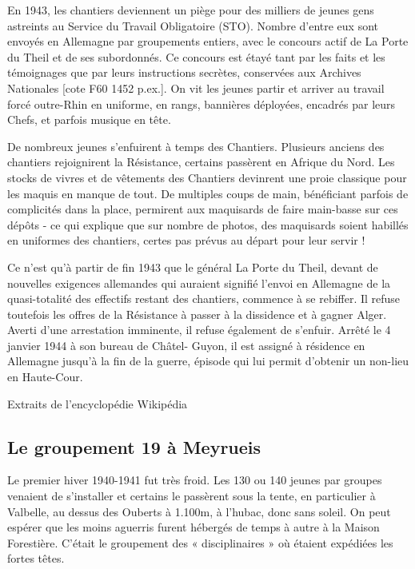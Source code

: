En 1943, les chantiers deviennent un piège pour des milliers de jeunes gens astreints au Service du Travail
Obligatoire (STO). Nombre d'entre eux sont envoyés en Allemagne par groupements entiers, avec le concours
actif de La Porte du Theil et de ses subordonnés. Ce concours est étayé tant par les faits et les témoignages
que par leurs instructions secrètes, conservées aux Archives Nationales [cote F60 1452 p.ex.]. On vit les
jeunes partir et arriver au travail forcé outre-Rhin en uniforme, en rangs, bannières déployées, encadrés par
leurs Chefs, et parfois musique en tête.

De nombreux jeunes s'enfuirent à temps des Chantiers. Plusieurs anciens des chantiers rejoignirent la
Résistance, certains passèrent en Afrique du Nord. Les stocks de vivres et de vêtements des Chantiers
devinrent une proie classique pour les maquis en manque de tout. De multiples coups de main, bénéficiant
parfois de complicités dans la place, permirent aux maquisards de faire main-basse sur ces dépôts - ce qui
explique que sur nombre de photos, des maquisards soient habillés en uniformes des chantiers, certes pas
prévus au départ pour leur servir !

Ce n'est qu'à partir de fin 1943 que le général La Porte du Theil, devant de nouvelles exigences allemandes
qui auraient signifié l'envoi en Allemagne de la quasi-totalité des effectifs restant des chantiers, commence
à se rebiffer. Il refuse toutefois les offres de la Résistance à passer à la dissidence et à gagner Alger. Averti
d'une arrestation imminente, il refuse également de s'enfuir. Arrêté le 4 janvier 1944 à son bureau de Châtel-
Guyon, il est assigné à résidence en Allemagne jusqu'à la fin de la guerre, épisode qui lui permit d'obtenir un
non-lieu en Haute-Cour.

\begin{flushright}
Extraits de l'encyclopédie Wikipédia
\end{flushright}


\subsection{Le groupement 19 à Meyrueis}

Le premier hiver 1940-1941 fut très froid. Les 130 ou 140 jeunes par groupes
venaient de s’installer et certains le passèrent sous la tente, en particulier à Valbelle,
au dessus des Ouberts à 1.100m, à l’hubac, donc sans soleil. On peut espérer que les
moins aguerris furent hébergés de temps à autre à la Maison Forestière. C’était le
groupement des « disciplinaires » où étaient expédiées les fortes têtes.

